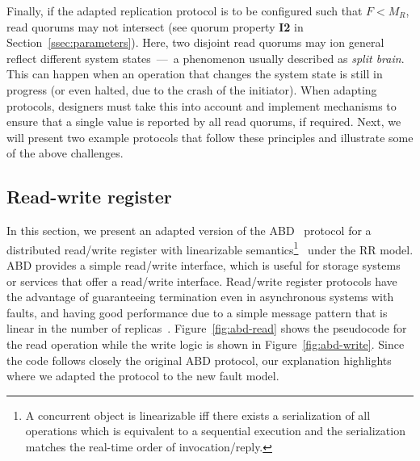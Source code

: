 Finally, if the adapted replication protocol is to be configured such
that $F<M_R$, read quorums may not intersect (see quorum property
\textbf{I2} in Section~\ref{ssec:parameters}).  Here, two disjoint
read quorums may ion general reflect different system states~---~a
phenomenon usually described as {\em split brain}.  This can happen
when an operation that changes the system state is still in progress
(or even halted, due to the crash of the initiator). When adapting
protocols, designers must take this into account and implement
mechanisms to ensure that a single value is reported by all read
quorums, if required.
%
Next, we will present two example protocols that follow these
principles and illustrate some of the above challenges.



\subsection{Read-write register}\label{ssec:abd}

In this section, we present an adapted version of the ABD~\cite{abd}
protocol for a distributed read/write register with linearizable
semantics\footnote{A concurrent object is
linearizable iff there exists a serialization of all operations
which is equivalent to a sequential execution and the
serialization matches the real-time order of invocation/reply.}~\cite{linearizability} under the \ac{RR} model. ABD provides a simple
read/write interface, which is useful for storage systems or services
that offer a read/write interface. Read/write register protocols have
the advantage of guaranteeing termination even in asynchronous systems
with faults, and having good performance due to a simple message
pattern that is linear in the number of replicas~\cite{gryff:nsdi20}.
%
Figure~\ref{fig:abd-read} shows the pseudocode for the read operation
while the write logic is shown in Figure~\ref{fig:abd-write}. Since
the code follows closely the original ABD protocol, our
explanation highlights where we adapted the protocol to the
new fault model.

